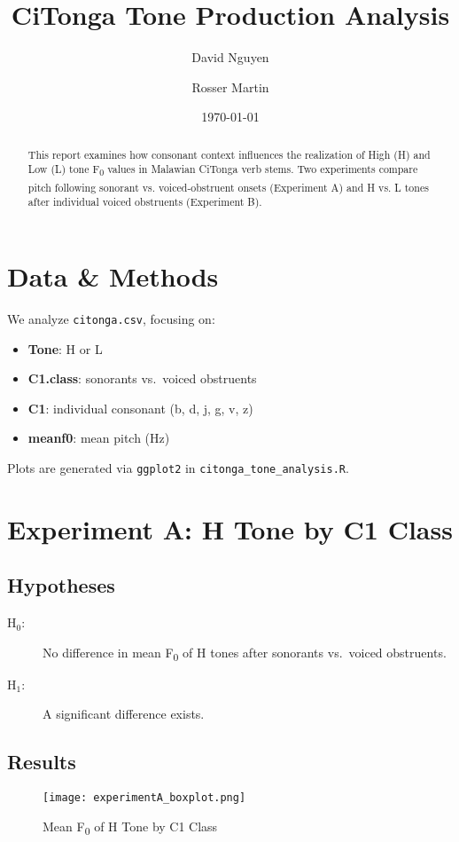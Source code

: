 \documentclass[11pt]{article}
\title{CiTonga Tone Production Analysis}
\author{David Nguyen \and Rosser Martin}
\date{\today}
\begin{document}
\maketitle

\begin{abstract}
This report examines how consonant context influences the realization of
High (H) and Low (L) tone F\textsubscript{0} values in Malawian CiTonga verb stems.
Two experiments compare pitch following sonorant vs. voiced‐obstruent onsets
(Experiment A) and H vs. L tones after individual voiced obstruents (Experiment B).
\end{abstract}

\section{Data \& Methods}
We analyze \texttt{citonga.csv}, focusing on:
\begin{itemize}
  \item \textbf{Tone}: H or L
  \item \textbf{C1.class}: sonorants vs.\ voiced obstruents
  \item \textbf{C1}: individual consonant (b, d, j, g, v, z)
  \item \textbf{meanf0}: mean pitch (Hz)
\end{itemize}

Plots are generated via \texttt{ggplot2} in \texttt{citonga\_tone\_analysis.R}.

\section{Experiment A: H Tone by C1 Class}

\subsection{Hypotheses}
\begin{description}
  \item[H$_0$:] No difference in mean F\textsubscript{0} of H tones after sonorants vs.\ voiced obstruents.
  \item[H$_1$:] A significant difference exists.
\end{description}

\subsection{Results}

\begin{figure}[h!]
  \centering
  \texttt{[image: experimentA\_boxplot.png]}
  \caption{Mean F\textsubscript{0} of H Tone by C1 Class}
\end{figure}
\end{document}
